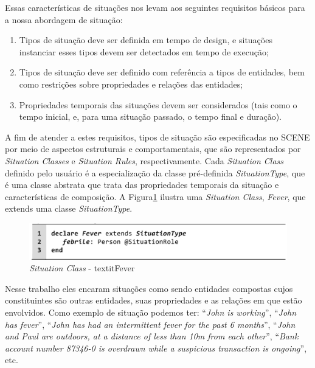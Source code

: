 \documentclass[12pt,a4paper,compsoc]{IEEEtran}
\begin{document}
  Essas características de situações nos levam aos seguintes requisitos básicos para a nossa
  abordagem de situação:
  \begin{enumerate}
    \item Tipos de situação deve ser definida em tempo de design, e situações instanciar esses
    tipos devem ser detectados em tempo de execução;
    \item Tipos de situação deve ser definido com referência a tipos de entidades, bem como 
    restrições sobre propriedades e relações das entidades;
    \item Propriedades temporais das situações devem ser considerados (tais como o tempo inicial,
    e, para uma situação passado, o tempo final e duração).  
  \end{enumerate}
  
  A fim de atender a estes requisitos, tipos de situação são especificadas no SCENE por meio de 
  aspectos estruturais e comportamentais, que são representados por  \textit{Situation Classes} e
  \textit{Situation Rules}, respectivamente. Cada \textit{Situation Class} definido pelo usuário é
  a especialização da classe pré-definida \textit{SituationType}, que é uma classe abstrata que
  trata das propriedades temporais da situação e características de composição.
  A Figura\ref{situation-classe-fever} ilustra uma \textit{Situation Class}, \textit{Fever}, que
  extends uma classe \textit{SituationType}.
  
  \begin{figure}[ht]
  \centerline{\includegraphics[scale=.25]{imagens/situation-classe-fever.png}}
  \caption{\textit{Situation Class} - textit{Fever} \cite{pereira2013rule}}
  \label{situation-classe-fever}
  \end{figure}

  Nesse trabalho eles encaram situações como sendo entidades compostas cujos constituintes são
  outras entidades, suas propriedades e as relações em que estão envolvidos. Como exemplo de
  situação podemos ter: ``\textit{John is working}'', ``\textit{John has fever}'', 
  ``\textit{John has had an intermittent fever for the past 6 months}'', 
  ``\textit{John and Paul are outdoors, at a distance of less than 10m from each other}'',
  ``\textit{Bank account number 87346-0 is overdrawn while a suspicious transaction is ongoing}'',
  etc.
\end{document}
